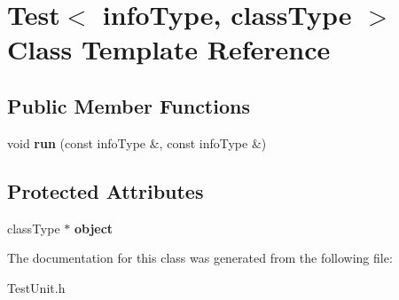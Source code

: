 \hypertarget{classTest}{\section{Test$<$ info\-Type, class\-Type $>$ Class Template Reference}
\label{classTest}
}
\subsection*{Public Member Functions}
\begin{DoxyCompactItemize}
\item 
\hypertarget{classTest_af4efb793913e8172ec96f64dd990b777}{void {\bfseries run} (const info\-Type \&, const info\-Type \&)}\label{classTest_af4efb793913e8172ec96f64dd990b777}

\end{DoxyCompactItemize}
\subsection*{Protected Attributes}
\begin{DoxyCompactItemize}
\item 
\hypertarget{classTest_ad228fd201d56aea9ebf26f7a5aefd2c1}{class\-Type $\ast$ {\bfseries object}}\label{classTest_ad228fd201d56aea9ebf26f7a5aefd2c1}

\end{DoxyCompactItemize}


The documentation for this class was generated from the following file\-:\begin{DoxyCompactItemize}
\item 
Test\-Unit.\-h\end{DoxyCompactItemize}
